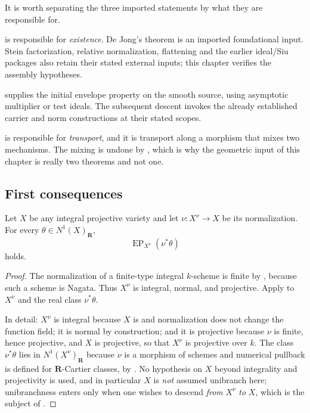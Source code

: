 \begin{remark}
\label{rem:ch42-three-quotations}
It is worth separating the three imported statements by what they are
responsible for.

 is responsible for \emph{existence}.
De Jong's theorem is an imported foundational input.
Stein factorization, relative normalization, flattening and the earlier
ideal/Siu packages also retain their stated external inputs;
this chapter verifies the assembly hypotheses.

 supplies the initial envelope property
on the smooth source, using asymptotic multiplier or test ideals.
The subsequent descent invokes the already established carrier and norm
constructions at their stated scopes.

 is responsible for \emph{transport}, and
it is transport along a morphism that mixes two mechanisms.  The mixing is
undone by , which is why the geometric
input of this chapter is really two theorems and not one.
\end{remark}

\subsection{First consequences}
\label{sec:ch42-consequences}

\begin{corollary}\label{cor:bj-normalization-source-ep}
Let $X$ be any integral projective variety and let
$\nu:X^\nu\to X$ be its normalization.
For every $\theta\in N^1(X)_{\mathbf R}$,
\[
                  \operatorname{EP}_{X^\nu}(\nu^*\theta)
\tag{42.10}\label{eq:bj-normalization-source-ep}
\]
holds.
\end{corollary}

\begin{proof}
The normalization of a finite-type integral $k$-scheme is finite by
\cite[\href{https://stacks.math.columbia.edu/tag/035S}{Tag 035S}]
{stacks-project}, because such a scheme is Nagata.
Thus $X^\nu$ is integral, normal, and projective.
Apply  to $X^\nu$ and the real class
$\nu^*\theta$.

In detail: $X^\nu$ is integral because $X$ is and normalization does not
change the function field; it is normal by construction; and it is
projective because $\nu$ is finite, hence projective, and $X$ is
projective, so that $X^\nu$ is projective over $k$.  The class
$\nu^*\theta$ lies in $N^1(X^\nu)_{\mathbf R}$ because $\nu$ is a
morphism of schemes and numerical pullback is defined for
$\mathbf R$-Cartier classes, by .  No
hypothesis on $X$ beyond integrality and projectivity is used, and in
particular $X$ is \emph{not} assumed unibranch here; unibranchness enters
only when one wishes to descend \emph{from} $X^\nu$ \emph{to} $X$,
which is the subject of
.
\end{proof}

